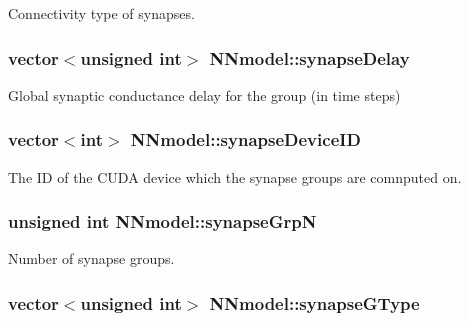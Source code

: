 Connectivity type of synapses. 

\hypertarget{classNNmodel_a3c7efe131920a17f9292c0d2ffd74d7c}{
\subsubsection[{synapse\+Delay}]{\setlength{\rightskip}{0pt plus 5cm}vector$<$unsigned int$>$ N\+Nmodel\+::synapse\+Delay}}\label{classNNmodel_a3c7efe131920a17f9292c0d2ffd74d7c}


Global synaptic conductance delay for the group (in time steps) 

\hypertarget{classNNmodel_a55d5ec678b5ed7756c7dbb4c4c604f51}{
\subsubsection[{synapse\+Device\+I\+D}]{\setlength{\rightskip}{0pt plus 5cm}vector$<$int$>$ N\+Nmodel\+::synapse\+Device\+I\+D}}\label{classNNmodel_a55d5ec678b5ed7756c7dbb4c4c604f51}


The I\+D of the C\+U\+D\+A device which the synapse groups are comnputed on. 

\hypertarget{classNNmodel_a1e6209fc2014ab9f1820a614cc246c67}{
\subsubsection[{synapse\+Grp\+N}]{\setlength{\rightskip}{0pt plus 5cm}unsigned int N\+Nmodel\+::synapse\+Grp\+N}}\label{classNNmodel_a1e6209fc2014ab9f1820a614cc246c67}


Number of synapse groups. 

\hypertarget{classNNmodel_a521aa25f9cc763dab52769da0b775470}{
\subsubsection[{synapse\+G\+Type}]{\setlength{\rightskip}{0pt plus 5cm}vector$<$unsigned int$>$ N\+Nmodel\+::synapse\+G\+Type}}\label{classNNmodel_a521aa25f9cc763dab52769da0b775470}


